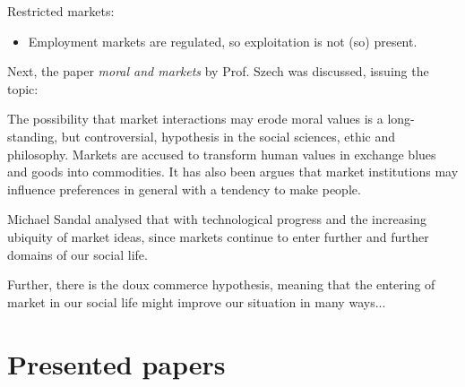 Restricted markets:

\begin{itemize}
	\item Employment markets are regulated, so exploitation is not (so) present.
\end{itemize}



Next, the paper \textit{moral and markets} by Prof. Szech was discussed, issuing the topic:


The possibility that market interactions may erode moral values is a long-standing, but controversial, hypothesis in the social sciences, ethic and philosophy. Markets are accused to transform human values in exchange blues and goods into commodities. It has also been argues that market institutions may influence preferences in general with a tendency to make people.

Michael Sandal analysed that with technological progress and the increasing ubiquity of market ideas, since markets continue to enter further and further domains of our social life.


Further, there is the doux commerce hypothesis, meaning that the entering of market in our social life might improve our situation in many ways...


\section{Presented papers}

